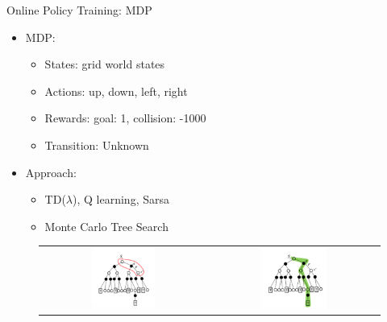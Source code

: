 \documentclass[xcolor=x11names,compress]{beamer}
\renewcommand{\(}{\begin{columns}}
\renewcommand{\)}{\end{columns}}
\newcommand{\<}[1]{\begin{column}{#1}}
\renewcommand{\>}{\end{column}}
\begin{document}
\begin{frame}{Online Policy Training: MDP}
\begin{itemize}
\item MDP:
\begin{itemize}
\item States: grid world states
\item Actions: up, down, left, right
\item Rewards: goal: 1, collision: -1000
\item Transition: Unknown
\end{itemize}
\pause
\item Approach:
\begin{itemize}
\item TD($\lambda$), Q learning, Sarsa
\item Monte Carlo Tree Search
\end{itemize}
\end{itemize}
\vspace{-0.1in}
\begin{figure}
\centering
\begin{tabular}{c c}
    \includegraphics[width=0.4\textwidth]{./figures/td0.png}&
    \includegraphics[width=0.4\textwidth]{./figures/mc.png}
\end{tabular}
\end{figure}
\end{frame}
\end{document}

